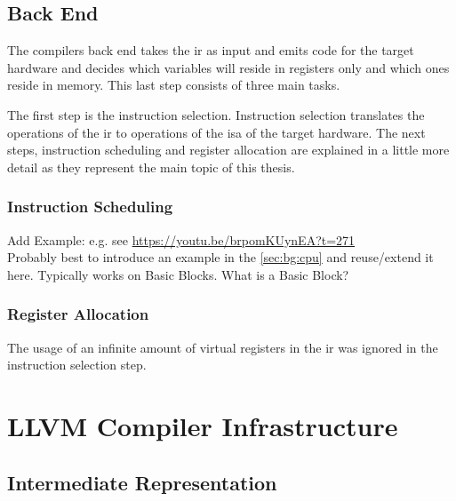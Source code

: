\subsection{Back End}
\label{sec:bg:compilers:backend}
The compilers back end takes the \ac{ir} as input and emits code for the target hardware and decides which variables will reside in registers only and which ones reside in memory.
This last step consists of three main tasks.

The first step is the instruction selection.
Instruction selection translates the operations of the \ac{ir} to operations of the \ac{isa} of the target hardware.
The next steps, instruction scheduling and register allocation are explained in a little more detail as they represent the main topic of this thesis.

\subsubsection{Instruction Scheduling}
Add Example: e.g. see \url{https://youtu.be/brpomKUynEA?t=271} \\
Probably best to introduce an example in the \cref{sec:bg:cpu} and reuse/extend it here.
Typically works on Basic Blocks. What is a Basic Block?

\subsubsection{Register Allocation}
The usage of an infinite amount of virtual registers in the \ac{ir} was ignored in the instruction selection step.

\section{LLVM Compiler Infrastructure}
\subsection{Intermediate Representation}

